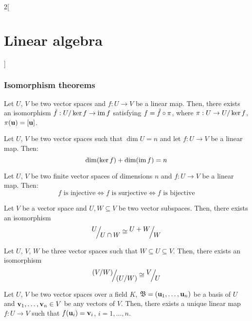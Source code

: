 \documentclass[../../../main.tex]{subfiles}
\begin{document}
\begin{multicols}{2}[\section{Linear algebra}]
  \subsubsection*{Isomorphism theorems}
  \begin{theorem}
    Let $U$, $V$ be two vector spaces and $f:U\rightarrow V$ be a linear map. Then, there exists an isomorphism $\Tilde{f}:\quot{U}{\ker f}\rightarrow \im f$ satisfying $f=\Tilde{f}\circ\pi$, where $\pi:U\rightarrow \quot{U}{\ker f}$, $\pi(\vb{u})=[\vb{u}]$.
    \begin{center}
      \begin{minipage}{\linewidth}
        \centering
        
      \end{minipage}
    \end{center}
  \end{theorem}
  \begin{corollary}
    Let $U$, $V$ be two vector spaces such that $\dim U=n$ and let $f:U\rightarrow V$ be a linear map. Then: $$\dim(\ker f)+\dim(\operatorname{im} f)=n$$
  \end{corollary}
  \begin{corollary}
    Let $U$, $V$ be two finite vector spaces of dimensions $n$ and $f:U\rightarrow V$ be a linear map. Then: $$f\text{ is injective}\iff f\text{ is surjective}\iff f\text{ is bijective}$$
  \end{corollary}
  \begin{theorem}
    Let $V$ be a vector space and $U,W\subseteq V$ be two vector subspaces. Then, there exists an isomorphism $$\quot{U}{U\cap W}\cong\quot{U+W}{W}$$
  \end{theorem}
  \begin{theorem}
    Let $U$, $V$, $W$ be three vector spaces such that $W\subseteq U\subseteq V$. Then, there exists an isomorphism $$\quot{{(\textstyle\quot{V}{W})}}{{(\textstyle\quot{U}{W})}}\cong\quot{V}{U}$$
  \end{theorem}
  \begin{theorem}
    Let $U$, $V$ be two vector spaces over a field $K$, $\mathfrak{B}=(\vb{u}_1,\ldots,\vb{u}_n)$ be a basis of $U$ and $\vb{v}_1,\ldots,\vb{v}_n\in V$ be any vectors of $V$. Then, there exists a unique linear map $f:U\rightarrow V$ such that $f(\vb{u}_i)=\vb{v}_i$, $i=1,\ldots,n$.
  \end{theorem}

\end{multicols}
\end{document}
